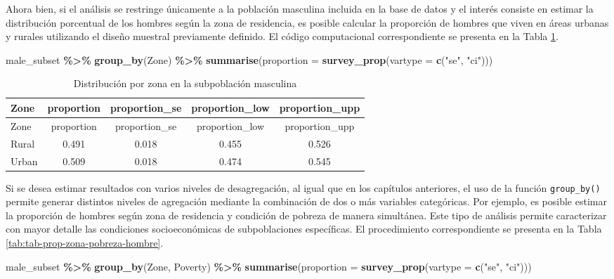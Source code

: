 \documentclass[
  spanish,
  12pt,
]{book}
\newenvironment{Shaded}{\begin{snugshade}}{\end{snugshade}}
\newcommand{\AttributeTok}[1]{\textcolor[rgb]{0.13,0.29,0.53}{#1}}
\newcommand{\FunctionTok}[1]{\textcolor[rgb]{0.13,0.29,0.53}{\textbf{#1}}}
\newcommand{\NormalTok}[1]{#1}
\newcommand{\SpecialCharTok}[1]{\textcolor[rgb]{0.81,0.36,0.00}{\textbf{#1}}}
\newcommand{\StringTok}[1]{\textcolor[rgb]{0.31,0.60,0.02}{#1}}
\begin{document}
Ahora bien, si el análisis se restringe únicamente a la población masculina incluida en la base de datos y el interés consiste en estimar la distribución porcentual de los hombres según la zona de residencia, es posible calcular la proporción de hombres que viven en áreas urbanas y rurales utilizando el diseño muestral previamente definido. El código computacional correspondiente se presenta en la Tabla \ref{tab:tab-prop-zona-hombre}.

\begin{Shaded}
\begin{Highlighting}[]
\NormalTok{male\_subset }\SpecialCharTok{\%\textgreater{}\%}
  \FunctionTok{group\_by}\NormalTok{(Zone) }\SpecialCharTok{\%\textgreater{}\%}
  \FunctionTok{summarise}\NormalTok{(}\AttributeTok{proportion =} \FunctionTok{survey\_prop}\NormalTok{(}\AttributeTok{vartype =} \FunctionTok{c}\NormalTok{(}\StringTok{"se"}\NormalTok{, }\StringTok{"ci"}\NormalTok{)))}
\end{Highlighting}
\end{Shaded}

\begin{longtable}[]{@{}lcccc@{}}
\caption{\label{tab:tab-prop-zona-hombre}Distribución por zona en la subpoblación masculina}\tabularnewline
\toprule\noalign{}
Zone & proportion & proportion\_se & proportion\_low & proportion\_upp \\
\midrule\noalign{}
\endfirsthead
\toprule\noalign{}
Zone & proportion & proportion\_se & proportion\_low & proportion\_upp \\
\midrule\noalign{}
\endhead
\bottomrule\noalign{}
\endlastfoot
Rural & 0.491 & 0.018 & 0.455 & 0.526 \\
Urban & 0.509 & 0.018 & 0.474 & 0.545 \\
\end{longtable}

Si se desea estimar resultados con varios niveles de desagregación, al igual que en los capítulos anteriores, el uso de la función \texttt{group\_by()} permite generar distintos niveles de agregación mediante la combinación de dos o más variables categóricas. Por ejemplo, es posible estimar la proporción de hombres según zona de residencia y condición de pobreza de manera simultánea. Este tipo de análisis permite caracterizar con mayor detalle las condiciones socioeconómicas de subpoblaciones específicas. El procedimiento correspondiente se presenta en la Tabla \ref{tab:tab-prop-zona-pobreza-hombre}.

\begin{Shaded}
\begin{Highlighting}[]
\NormalTok{male\_subset }\SpecialCharTok{\%\textgreater{}\%}
  \FunctionTok{group\_by}\NormalTok{(Zone, Poverty) }\SpecialCharTok{\%\textgreater{}\%}
  \FunctionTok{summarise}\NormalTok{(}\AttributeTok{proportion =} \FunctionTok{survey\_prop}\NormalTok{(}\AttributeTok{vartype =} \FunctionTok{c}\NormalTok{(}\StringTok{"se"}\NormalTok{, }\StringTok{"ci"}\NormalTok{)))}
\end{Highlighting}
\end{Shaded}
\end{document}
